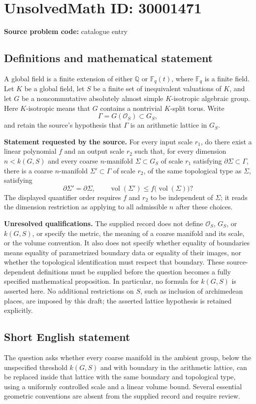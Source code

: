 \documentclass[11pt]{article}
\newcommand{\Q}{\mathbb{Q}}
\newcommand{\F}{\mathbb{F}}
\begin{document}
\section*{UnsolvedMath ID: 30001471}
\textbf{Source problem code:} catalogue entry
\subsection{Definitions and mathematical statement}
A global field is a finite extension of either \(\Q\) or \(\F_q(t)\), where \(\F_q\) is a finite field. Let \(K\) be a global field, let \(S\) be a finite set of inequivalent valuations of \(K\), and let \(G\) be a noncommutative absolutely almost simple \(K\)-isotropic algebraic group. Here \(K\)-isotropic means that \(G\) contains a nontrivial \(K\)-split torus. Write
\[
\Gamma=G(\mathcal O_S)\subset G_S,
\]
and retain the source's hypothesis that \(\Gamma\) is an arithmetic lattice in \(G_S\).

\textbf{Statement requested by the source.} For every input scale \(r_1\), do there exist a linear polynomial \(f\) and an output scale \(r_2\) such that, for every dimension \(n<k(G,S)\) and every coarse \(n\)-manifold \(\Sigma\subset G_S\) of scale \(r_1\) satisfying \(\partial\Sigma\subset\Gamma\), there is a coarse \(n\)-manifold \(\Sigma'\subset\Gamma\) of scale \(r_2\), of the same topological type as \(\Sigma\), satisfying
\[
\partial\Sigma'=\partial\Sigma,
\qquad
\operatorname{vol}(\Sigma')\leq f\bigl(\operatorname{vol}(\Sigma)\bigr)?
\]
The displayed quantifier order requires \(f\) and \(r_2\) to be independent of \(\Sigma\); it reads the dimension restriction as applying to all admissible \(n\) after these choices.

\textbf{Unresolved qualifications.} The supplied record does not define \(\mathcal O_S\), \(G_S\), or \(k(G,S)\), or specify the metric, the meaning of a coarse manifold and its scale, or the volume convention. It also does not specify whether equality of boundaries means equality of parametrized boundary data or equality of their images, nor whether the topological identification must respect that boundary. These source-dependent definitions must be supplied before the question becomes a fully specified mathematical proposition. In particular, no formula for \(k(G,S)\) is asserted here. No additional restrictions on \(S\), such as inclusion of archimedean places, are imposed by this draft; the asserted lattice hypothesis is retained explicitly.
\subsection{Short English statement}
The question asks whether every coarse manifold in the ambient group, below the unspecified threshold \(k(G,S)\) and with boundary in the arithmetic lattice, can be replaced inside that lattice with the same boundary and topological type, using a uniformly controlled scale and a linear volume bound. Several essential geometric conventions are absent from the supplied record and require review.
\end{document}
